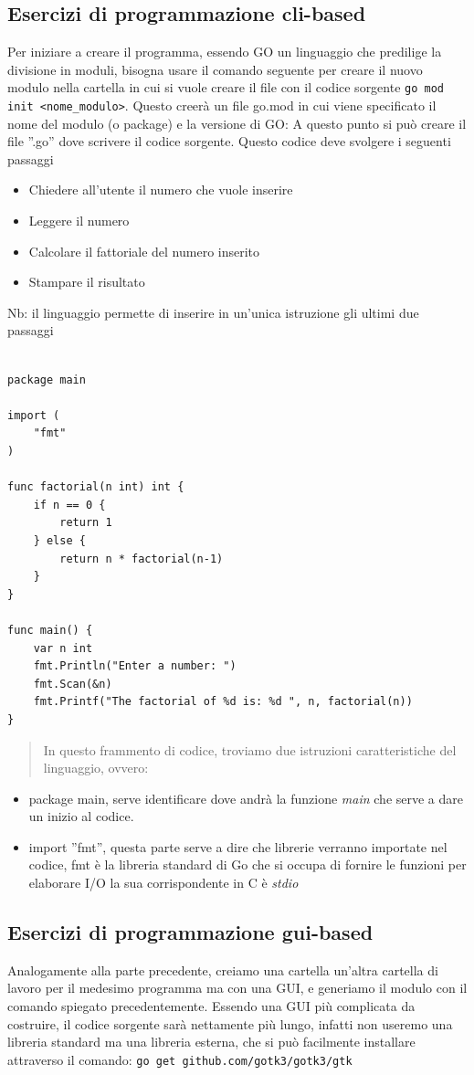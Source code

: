 \subsection{Esercizi di programmazione cli-based}
Per iniziare a creare il programma, essendo GO un linguaggio che predilige la divisione in moduli, bisogna usare il comando seguente per creare il nuovo modulo nella cartella in cui si vuole creare il file con il codice sorgente \texttt{go mod init <nome\_modulo>}.\newline 
Questo creerà un file go.mod in cui viene specificato il nome del modulo (o package) e la versione di GO:
A questo punto si può creare il file ''.go'' dove scrivere il codice sorgente.
Questo codice deve svolgere i seguenti passaggi
\begin{itemize}
\item Chiedere all'utente il numero che vuole inserire
\item Leggere il numero
\item Calcolare il fattoriale del numero inserito
\item Stampare il risultato
\end{itemize}
Nb: il linguaggio permette di inserire in un'unica istruzione gli ultimi due passaggi

\begin{verbatim}
  
package main

import (
	"fmt"
)

func factorial(n int) int {
	if n == 0 {
		return 1
	} else {
		return n * factorial(n-1)
	}
}

func main() {
	var n int
	fmt.Println("Enter a number: ")
	fmt.Scan(&n)
	fmt.Printf("The factorial of %d is: %d ", n, factorial(n))
}
\end{verbatim}
\begin{quote}
In questo frammento di codice, troviamo due istruzioni caratteristiche del linguaggio, ovvero:
\end{quote}
\begin{itemize}
\item package main, serve identificare dove andrà la funzione \emph{main} che serve a dare un inizio al codice.
\item  import ''fmt'', questa parte serve a dire che librerie verranno importate nel codice, fmt è la libreria standard di Go che si occupa di fornire le funzioni per elaborare I/O la sua corrispondente in C è \emph{stdio}
\end{itemize}
\subsection{Esercizi di programmazione gui-based}
Analogamente alla parte precedente, creiamo una cartella un'altra cartella di lavoro per il medesimo programma ma con una GUI, e generiamo il modulo con il comando spiegato precedentemente. Essendo una GUI più complicata da costruire, il codice sorgente sarà nettamente più lungo, infatti non useremo una libreria standard ma una libreria esterna, che si può facilmente installare attraverso il comando:
\texttt{go get github.com/gotk3/gotk3/gtk} \newline

